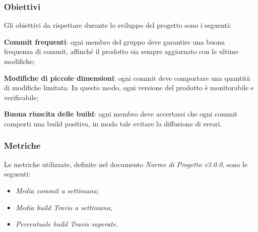 \subsubsection{Obiettivi} 
Gli obiettivi da rispettare durante lo sviluppo del progetto sono i seguenti:
\begin{itemize}
	\item{\textbf{Commit frequenti}: ogni membro del gruppo deve garantire una buona frequenza di commit, affinché il prodotto sia sempre aggiornato con le ultime modifiche;
	\item{\textbf{Modifiche di piccole dimensioni}: ogni commit deve comportare una quantità di modifiche limitata. In questo modo, ogni versione del prodotto è monitorabile e verificabile;}
	\item{\textbf{Buona riuscita delle build}: ogni membro deve accertarsi che ogni commit comporti una build positiva, in modo tale evitare la diffusione di errori.}
	}
\end{itemize}
\subsubsection{Metriche}
Le metriche utilizzate, definite nel documento \emph{Norme di Progetto v3.0.0}, sono le seguenti:
\begin{itemize}
	\item\emph{Media commit a settimana;}
	\item\emph{Media build Travis a settimana;}
	\item\emph{Percentuale build Travis superate.}
\end{itemize}

